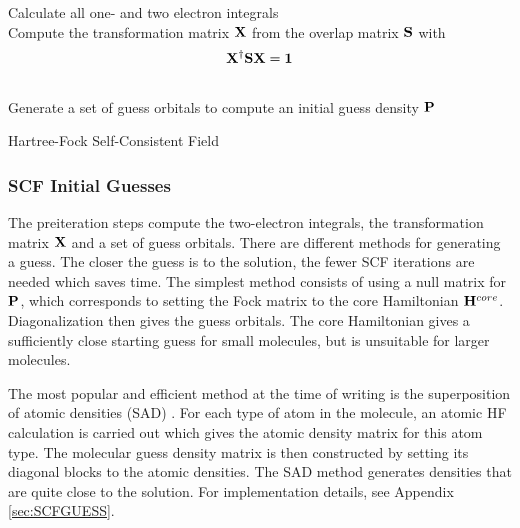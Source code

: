 \begin{algorithm}
Calculate all one- and two electron integrals
\\
Compute the transformation matrix $\mathbf{X}$ from the overlap matrix $\mathbf{S}$ with
\begin{equation}
\mathbf{X}^{\dagger} \mathbf{SX} = \mathbf{1} 
\end{equation}
\\
Generate a set of guess orbitals to compute an initial guess density $\mathbf{P}$
\\
\caption{Hartree-Fock Self-Consistent Field}
\label{algo:SCF}
\end{algorithm}

\subsubsection{SCF Initial Guesses}

The preiteration steps compute the two-electron integrals, the transformation matrix $\mathbf{X}$ and a set of guess orbitals. There are different methods for generating a guess. The closer the guess is to the solution, the fewer SCF iterations are needed which saves time. The simplest method consists of using a null matrix for $\mathbf{P}$, which corresponds to setting the Fock matrix to the core Hamiltonian $\mathbf{H}^{core}$. Diagonalization then gives the guess orbitals. The core Hamiltonian gives a sufficiently close starting guess for small molecules, but is unsuitable for larger molecules. 

The most popular and efficient method at the time of writing is the superposition of atomic densities (SAD) \cite{Van2006}. For each type of atom in the molecule, an atomic HF calculation is carried out which gives the atomic density matrix for this atom type. The molecular guess density matrix is then constructed by setting its diagonal blocks to the atomic densities. The SAD method generates densities that are quite close to the solution. For implementation details, see Appendix \ref{sec:SCFGUESS}.

